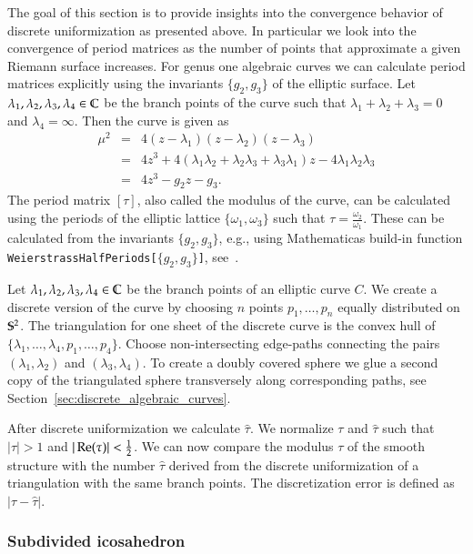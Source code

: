 \documentclass[Thesis]{subfiles}
\begin{document}
The goal of this section is to provide insights into the convergence behavior of discrete uniformization as presented above. In particular we look into the convergence of period matrices as the number of points that approximate a given Riemann surface increases. For genus one algebraic curves we can calculate period matrices explicitly using the invariants $\{g_2,g_3\}$ of the elliptic surface. Let $\lambda_1,\lambda_2,\lambda_3,\lambda_4\in\C$ be the branch points of the curve such that $\lambda_1+\lambda_2+\lambda_3=0$ and $\lambda_4=\infty$. Then the curve is given as
\begin{eqnarray*}
\mu^2&=&4(z-\lambda_1)(z-\lambda_2)(z-\lambda_3)\\
&=&4z^3+4(\lambda_1\lambda_2+\lambda_2\lambda_3+\lambda_3\lambda_1)z - 4\lambda_1\lambda_2\lambda_3\\
&=&4z^3-g_2z-g_3.
\end{eqnarray*}
The period matrix $[\tau]$, also called the modulus of the curve, can be calculated using the periods of the elliptic lattice $\{\omega_1,\omega_3\}$ such that $\tau = \frac{\omega_2}{\omega_1}$. These can be calculated from the invariants $\{g_2,g_3\}$, e.g., using {\sc Mathematica}s build-in function {\tt WeierstrassHalfPeriods[$\{g_2,g_3\}$]}, see~\cite{WeierstrassHalfPeriods_website}.

Let $\lambda_1, \lambda_2, \lambda_3, \lambda_4 \in \C$ be the branch points of an elliptic curve $C$. We create a discrete version of the curve by choosing $n$ points $p_1,\ldots,p_n$ equally distributed on $\S^2$. The triangulation for one sheet of the discrete curve is the convex hull of $\{\lambda_1,\ldots,\lambda_4,p_1,\ldots, p_4\}$. Choose non-intersecting edge-paths connecting the pairs $(\lambda_1,\lambda_2)$ and $(\lambda_3,\lambda_4)$. To create a doubly covered sphere we glue a second copy of the triangulated sphere transversely along corresponding paths, see Section~\ref{sec:discrete_algebraic_curves}.

After discrete uniformization we calculate $\hat \tau$. We normalize $\tau$ and $\hat \tau$ such that $|\tau|>1$ and $|\re(\tau)| < \frac{1}{2}$. We can now compare the modulus $\tau$ of the smooth structure with the number $\hat \tau$ derived from the discrete uniformization of a triangulation with the same branch points. The discretization error is defined as $|\tau-\hat \tau|$.

\subsubsection{Subdivided icosahedron}
\end{document}
